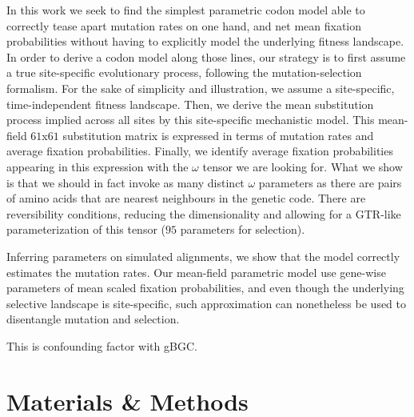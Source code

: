 In this work we seek to find the simplest parametric codon model able to correctly tease apart mutation rates on one hand, and net mean fixation probabilities without having to explicitly model the underlying fitness landscape.
In order to derive a codon model along those lines, our strategy is to first assume a true site-specific evolutionary process, following the mutation-selection formalism.
For the sake of simplicity and illustration, we assume a site-specific, time-independent fitness landscape.
Then, we derive the mean substitution process implied across all sites by this site-specific mechanistic model.
This mean-field $61$x$61$ substitution matrix is expressed in terms of mutation rates and average fixation probabilities.
Finally, we identify average fixation probabilities appearing in this expression with the $\omega$ tensor we are looking for.
What we show is that we should in fact invoke as many distinct $\omega$ parameters as there are pairs of amino acids that are nearest neighbours in the genetic code.
There are reversibility conditions, reducing the dimensionality and allowing for a GTR-like parameterization of this tensor ($95$ parameters for selection).

Inferring parameters on simulated alignments, we show that the model correctly estimates the mutation rates.
Our mean-field parametric model use gene-wise parameters of mean scaled fixation probabilities, and even though the underlying selective landscape is site-specific, such approximation can nonetheless be used to disentangle mutation and selection.

This is confounding factor with \acrshort{gBGC}.


\section{Materials \& Methods}

